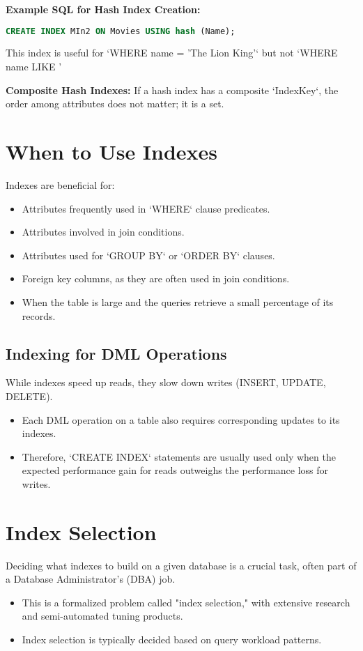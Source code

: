 \documentclass{article}
\begin{document}
\textbf{Example SQL for Hash Index Creation:}
\begin{lstlisting}[language=SQL]
CREATE INDEX MIn2 ON Movies USING hash (Name);
\end{lstlisting}
This index is useful for `WHERE name = 'The Lion King'` but not `WHERE name LIKE '%

\textbf{Composite Hash Indexes:}
If a hash index has a composite `IndexKey`, the order among attributes does not matter; it is a set.

\section*{When to Use Indexes}
Indexes are beneficial for:
\begin{itemize}
    \item Attributes frequently used in `WHERE` clause predicates.
    \item Attributes involved in join conditions.
    \item Attributes used for `GROUP BY` or `ORDER BY` clauses.
    \item Foreign key columns, as they are often used in join conditions.
    \item When the table is large and the queries retrieve a small percentage of its records.
\end{itemize}

\subsection*{Indexing for DML Operations}
While indexes speed up reads, they slow down writes (INSERT, UPDATE, DELETE).
\begin{itemize}
    \item Each DML operation on a table also requires corresponding updates to its indexes.
    \item Therefore, `CREATE INDEX` statements are usually used only when the expected performance gain for reads outweighs the performance loss for writes.
\end{itemize}

\section*{Index Selection}
Deciding what indexes to build on a given database is a crucial task, often part of a Database Administrator's (DBA) job.
\begin{itemize}
    \item This is a formalized problem called "index selection," with extensive research and semi-automated tuning products.
    \item Index selection is typically decided based on query workload patterns.
\end{itemize}
\end{document}
